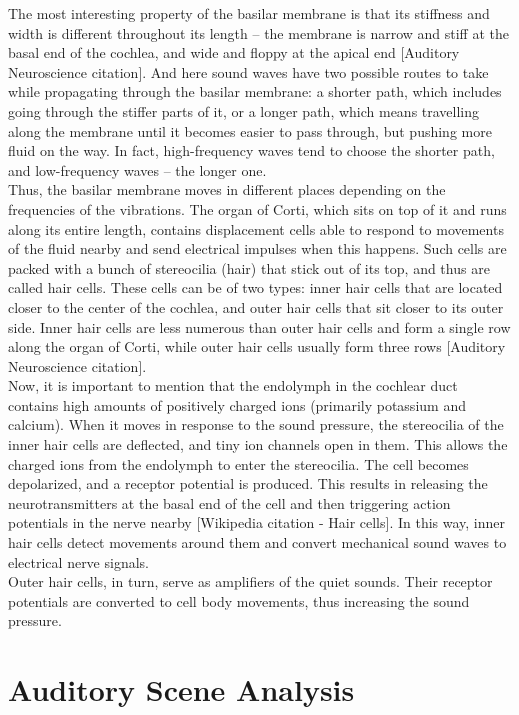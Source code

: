 The most interesting property of the basilar membrane is that its stiffness and width is different throughout its length – the membrane is narrow and stiff at the basal end of the cochlea, and wide and floppy at the apical end [Auditory Neuroscience citation]. And here sound waves have two possible routes to take while propagating through the basilar membrane: a shorter path, which includes going through the stiffer parts of it, or a longer path, which means travelling along the membrane until it becomes easier to pass through, but pushing more fluid on the way. In fact, high-frequency waves tend to choose the shorter path, and low-frequency waves – the longer one.\\

Thus, the basilar membrane moves in different places depending on the frequencies of the vibrations. The organ of Corti, which sits on top of it and runs along its entire length, contains displacement cells able to respond to movements of the fluid nearby and send electrical impulses when this happens. Such cells are packed with a bunch of stereocilia (hair) that stick out of its top, and thus are called hair cells. These cells can be of two types: inner hair cells that are located closer to the center of the cochlea, and outer hair cells that sit closer to its outer side. Inner hair cells are less numerous than outer hair cells and form a single row along the organ of Corti, while outer hair cells usually form three rows [Auditory Neuroscience citation].\\

Now, it is important to mention that the endolymph in the cochlear duct contains high amounts of positively charged ions (primarily potassium and calcium). When it moves in response to the sound pressure, the stereocilia of the inner hair cells are deflected, and tiny ion channels open in them. This allows the charged ions from the endolymph to enter the stereocilia. The cell becomes depolarized, and a receptor potential is produced. This results in releasing the neurotransmitters at the basal end of the cell and then triggering action potentials in the nerve nearby [Wikipedia citation - Hair cells]. In this way, inner hair cells detect movements around them and convert mechanical sound waves to electrical nerve signals.\\

Outer hair cells, in turn, serve as amplifiers of the quiet sounds. Their receptor potentials are converted to cell body movements, thus increasing the sound pressure. 

\section{Auditory Scene Analysis}

